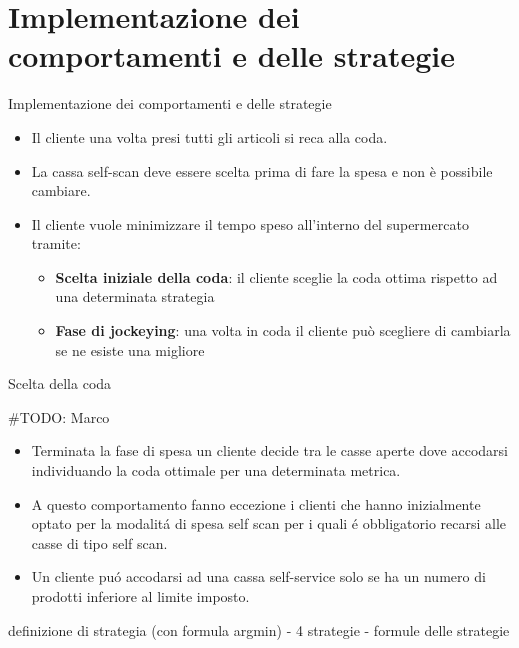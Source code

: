 \section{Implementazione dei comportamenti e delle strategie}





\begin{frame}{Implementazione dei comportamenti e delle strategie}
	\begin{itemize}
		\item Il cliente una volta presi tutti gli articoli si reca alla coda.
		\item La cassa self-scan deve essere scelta prima di fare la spesa e non è possibile cambiare.
		\item Il cliente vuole minimizzare il tempo speso all'interno del supermercato tramite:
		\begin{itemize}
			\item \textbf{Scelta iniziale della coda}: il cliente sceglie la coda ottima rispetto ad una determinata strategia
			\item \textbf{Fase di jockeying}: una volta in coda il cliente può scegliere di cambiarla se ne esiste una migliore
		\end{itemize}
	\end{itemize}
\end{frame}


\begin{frame}{Scelta della coda}
  \centering

  \#TODO: Marco

  \begin{itemize}
  \item Terminata la fase di spesa un cliente decide tra le casse
    aperte dove accodarsi individuando la coda ottimale per una
    determinata metrica.

  \item A questo comportamento fanno eccezione i clienti che hanno
    inizialmente optato per la modalitá di spesa self scan per i quali
    é obbligatorio recarsi alle casse di tipo self scan.

  \item Un cliente puó accodarsi ad una cassa self-service solo se ha
    un numero di prodotti inferiore al limite imposto.
  \end{itemize}
  
  definizione di strategia (con formula argmin) - 4 strategie -
  formule delle strategie
\end{frame}


